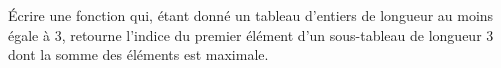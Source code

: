 \exer{}
\setcounter{numques}{0}

Écrire une fonction qui, étant donné un tableau d'entiers de longueur au moins
égale à 3, retourne l'indice du premier élément d'un sous-tableau de longueur 3
dont la somme des éléments est maximale.